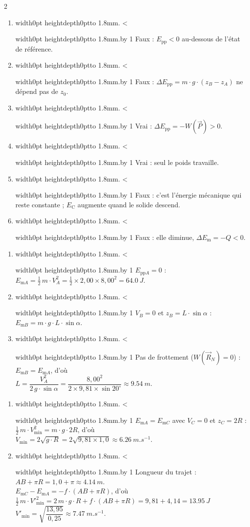 \documentclass[11pt,a4paper]{article}
\newcommand{\vect}[1]{\overrightarrow{#1}}
\newcommand{\Ec}{E_{\mathrm{C}}}
\newif\ifeleve
\newlength{\interligne}\setlength{\interligne}{7mm}
\newlength{\replen}
\newcommand{\pointilles}{{\color{cInk2!60}\leaders\hbox to 1.8mm{\hss.\hss}\hfill}\kern0pt}
\newcommand{\lignes}[1]{\leavevmode\vrule width0pt height\dimexpr\interligne-1mm\relax depth0pt\pointilles
  \lgn=1 \loop\ifnum\lgn<#1 \par\nointerlineskip\noindent\vrule width0pt height\interligne depth0pt\pointilles\advance\lgn by 1 \repeat}
\newcommand{\rep}[1]{%
  \ifeleve
    \sbox{\repbox}{\parbox{\linewidth}{#1}}%
    \replen=\dimexpr\ht\repbox+\dp\repbox\relax
    \repn=\numexpr\replen/\baselineskip+1\relax
    \ifnum\repn<2 \repn=2\fi
    \edef\nblignes{\the\repn}\lignes{\nblignes}%
  \else #1\fi}
\newcommand{\Epp}{E_{\mathrm{pp}}}
\newcommand{\Em}{E_{\mathrm{m}}}
\newcommand{\Eppi}[1]{E_{\mathrm{pp}#1}}
\newcommand{\Emi}[1]{E_{\mathrm{m}#1}}
\begin{document}
\begin{multicols}{2}
\begin{enumerate}[label={\sffamily\bfseries\alph*)},leftmargin=5mm,itemsep=0pt]
  \item \rep{Faux : $\Epp < 0$ au-dessous de l’état de référence.}
  \item \rep{Faux : $\Delta\Epp = m\cdot g\cdot(z_B - z_A)$ ne dépend pas de $z_0$.}
  \item \rep{Vrai : $\Delta\Epp = -W(\vect P) > 0$.}
  \item \rep{Vrai : seul le poids travaille.}
  \item \rep{Faux : c’est l’énergie mécanique qui reste constante ; $\Ec$ augmente quand le solide descend.}
  \item \rep{Faux : elle diminue, $\Delta\Em = -Q < 0$.}
\end{enumerate}

\begin{enumerate}[label={\sffamily\bfseries\arabic*.},leftmargin=5mm,itemsep=1pt]
  \item \rep{$\Eppi{A} = 0$ : $\Emi{A} = \frac{1}{2}\,m\cdot V_A^2 = \frac{1}{2}\times2{,}00\times8{,}00^2 = \qty{64,0}{J}$.}
  \item \rep{$V_B = 0$ et $z_B = L\cdot\sin\alpha$ : $\Emi{B} = m\cdot g\cdot L\cdot\sin\alpha$.}
  \item \rep{Pas de frottement ($W(\vect R_N) = 0$) : $\Emi{B} = \Emi{A}$, d’où\\ $L = \dfrac{V_A^2}{2\,g\cdot\sin\alpha} = \dfrac{8{,}00^2}{2\times9{,}81\times\sin20^\circ} \approx \qty{9,54}{m}$.}
\end{enumerate}

\begin{enumerate}[label={\sffamily\bfseries\arabic*.},leftmargin=5mm,itemsep=1pt]
  \item \rep{$\Emi{A} = \Emi{C}$ avec $V_C = 0$ et $z_C = 2R$ : $\frac{1}{2}\,m\cdot V_{\min}^2 = m\cdot g\cdot2R$, d’où\\ $V_{\min} = 2\sqrt{g\cdot R} = 2\sqrt{9{,}81\times1{,}0} \approx \qty{6,26}{m.s^{-1}}$.}
  \item \rep{Longueur du trajet : $AB + \pi R = 1{,}0 + \pi \approx \qty{4,14}{m}$.\\ $\Emi{C} - \Emi{A} = -f\cdot(AB + \pi R)$, d’où\\ $\frac{1}{2}\,m\cdot V'^2_{\min} = 2\,m\cdot g\cdot R + f\cdot(AB + \pi R) = 9{,}81 + 4{,}14 = \qty{13,95}{J}$\\ $V'_{\min} = \sqrt{\dfrac{13{,}95}{0{,}25}} \approx \qty{7,47}{m.s^{-1}}$.}
\end{enumerate}


\end{multicols}
\end{document}
